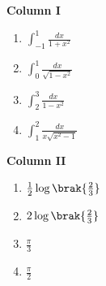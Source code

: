 			\begin{multicols}{2}
			

				\textbf{Column I}

				
				\begin{enumerate}

					\item $\int_{-1}^{1}\frac{dx}{1+x^{2}}$

					\item $\int_{0}^{1}\frac{dx}{\sqrt{1-x^{2}}}$

					\item $\int_{2}^{3}\frac{dx}{1-x^{2}}$

					\item $\int_{1}^{2}\frac{dx}{x\sqrt{x^{2}-1}}$

				\end{enumerate}
			\columnbreak
				\textbf{Column II}
				\begin{enumerate}
					\item $\frac{1}{2}\log\brak{\frac{2}{3}}$

					\item $2\log\brak{\frac{2}{3}}$

					\item $\frac{\pi}{3}$

					\item $\frac{\pi}{2}$
				\end{enumerate}
			\end{multicols}


